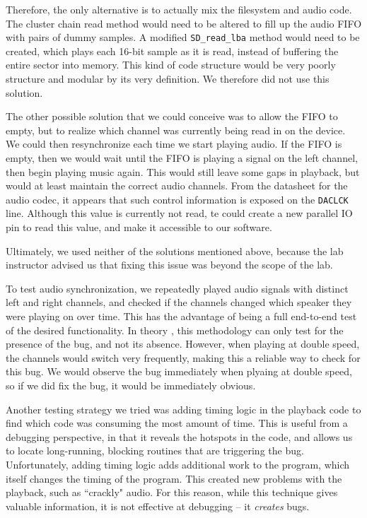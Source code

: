 \documentclass[12pt]{article}
\begin{document}
Therefore, the only alternative is to actually mix the filesystem and audio code.
The cluster chain read method would need to be altered to fill up the audio FIFO
with pairs of dummy samples.
A modified \texttt{SD\_read\_lba} method would need to be created, which plays
each 16-bit sample as it is read, instead of buffering the entire sector into
memory.
This kind of code structure would be very poorly structure and modular by its
very definition.
We therefore did not use this solution.

The other possible solution that we could conceive was to allow the FIFO to
empty, but to realize which channel was currently being read in on the device.
We could then resynchronize each time we start playing audio.
If the FIFO is empty, then we would wait until the FIFO is playing a signal on
the left channel, then begin playing music again.
This would still leave some gaps in playback, but would at least maintain
the correct audio channels.
From the datasheet for the audio codec, it appears that such control information
is exposed on the \texttt{DACLCK} line.
Although this value is currently not read, te could create a new parallel IO pin
to read this value, and make it accessible to our software.

Ultimately, we used neither of the solutions mentioned above, because the lab
instructor advised us that fixing this issue was beyond the scope of the lab.

To test audio synchronization, we repeatedly played audio signals with distinct
left and right channels, and checked if the channels changed which speaker they
were playing on over time.
This has the advantage of being a full end-to-end test of the desired
functionality.
In theory , this methodology can only test for the presence of the bug, and not
its absence.
However, when playing at double speed, the channels would switch very frequently,
making this a reliable way to check for this bug.
We would observe the bug immediately when plyaing at double speed, so if we
did fix the bug, it would be immediately obvious.

Another testing strategy we tried was adding timing logic in the playback code
to find which code was consuming the most amount of time.
This is useful from a debugging perspective, in that it reveals the hotspots in
the code, and allows us to locate long-running, blocking routines that are
triggering the bug.
Unfortunately, adding timing logic adds additional work to the program, which
itself changes the timing of the program.
This created new problems with the playback, such as ``crackly" audio.
For this reason, while this technique gives valuable information, it is not
effective at debugging -- it \emph{creates} bugs.
\end{document}
